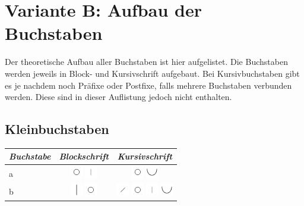 \chapter{Variante B: Aufbau der Buchstaben}
\label{anhang_aufbau}
Der theoretische Aufbau aller Buchstaben ist hier aufgelistet. Die Buchstaben werden jeweils in Block- und Kursivschrift aufgebaut. Bei Kursivbuchstaben gibt es je nachdem noch Präfixe oder Postfixe, falls mehrere Buchstaben verbunden werden. Diese sind in dieser Auflistung jedoch nicht enthalten.

\section{Kleinbuchstaben}
\begin{table}[!h]
  \begin{center}
    \begin{tabular}{ m{2cm} | c | c }
	\emph{Buchstabe}&\emph{Blockschrift} &\emph{Kursivschrift}\\ \hline
	a &
	\includegraphics[width=15pt]{./img/b_kreis_klein.pdf}
	\includegraphics[width=15pt]{./img/b_gerade_klein.pdf}
	&
	\includegraphics[width=15pt]{./img/b_kreis_klein.pdf}
	\includegraphics[width=15pt]{./img/b_halb_oben.pdf}
	\\ \hline

            b &
	\includegraphics[width=15pt]{./img/a_gerade.pdf}
	\includegraphics[width=15pt]{./img/b_kreis_klein.pdf}	
	&
	\includegraphics[width=15pt]{./img/b_gerade_vor_klein.pdf}
	\includegraphics[width=15pt]{./img/b_kreis_klein.pdf}
	\includegraphics[width=15pt]{./img/b_gerade_klein.pdf}
	\includegraphics[width=15pt]{./img/b_halb_oben.pdf}
	\\ \hline


\end{tabular}
\end{center}
\end{table}
